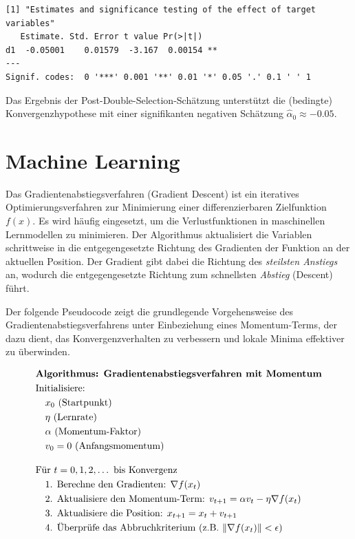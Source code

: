 \documentclass[
  a4paper,
  DIV=11,
  oneside]{scrreprt}
\begin{document}
\begin{verbatim}
[1] "Estimates and significance testing of the effect of target variables"
   Estimate. Std. Error t value Pr(>|t|)   
d1  -0.05001    0.01579  -3.167  0.00154 **
---
Signif. codes:  0 '***' 0.001 '**' 0.01 '*' 0.05 '.' 0.1 ' ' 1
\end{verbatim}

Das Ergebnis der Post-Double-Selection-Schätzung unterstützt die
(bedingte) Konvergenzhypothese mit einer signifikanten negativen
Schätzung \(\widehat{\alpha}_0\approx-0.05\).


\chapter{Machine Learning}\label{machine-learning}

Das Gradientenabstiegsverfahren (Gradient Descent) ist ein iteratives
Optimierungsverfahren zur Minimierung einer differenzierbaren
Zielfunktion \(f(x)\). Es wird häufig eingesetzt, um die
Verlustfunktionen in maschinellen Lernmodellen zu minimieren. Der
Algorithmus aktualisiert die Variablen schrittweise in die
entgegengesetzte Richtung des Gradienten der Funktion an der aktuellen
Position. Der Gradient gibt dabei die Richtung des \emph{steilsten
Anstiegs} an, wodurch die entgegengesetzte Richtung zum schnellsten
\emph{Abstieg} (Descent) führt.

Der folgende Pseudocode zeigt die grundlegende Vorgehensweise des
Gradientenabstiegsverfahrens unter Einbeziehung eines Momentum-Terms,
der dazu dient, das Konvergenzverhalten zu verbessern und lokale Minima
effektiver zu überwinden.

\begin{align}
& \textbf{Algorithmus: Gradientenabstiegsverfahren mit Momentum} \\
& \textup{Initialisiere: }\\ 
& \quad x_0 \text{ (Startpunkt) }\\
& \quad \eta \text{ (Lernrate) }\\
& \quad \alpha \text{ (Momentum-Faktor) }\\ 
& \quad v_0 = 0 \text{ (Anfangsmomentum) } \\[1em]
& \text{Für } t = 0, 1, 2, \dots \text{ bis Konvergenz} \\
& \quad \text{1. Berechne den Gradienten: } \nabla f(x_t) \\
& \quad \text{2. Aktualisiere den Momentum-Term: } v_{t+1} = \alpha v_t - \eta \nabla f(x_t) \\
& \quad \text{3. Aktualisiere die Position: } x_{t+1} = x_t + v_{t+1} \\
& \quad \text{4. Überprüfe das Abbruchkriterium (z.B. } \| \nabla f(x_t) \| < \epsilon\text{)} \\
\end{align}
\end{document}
